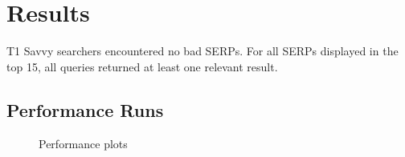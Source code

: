 \section{Results}

T1 Savvy searchers encountered no bad SERPs. For all SERPs displayed in the top 15, all queries returned at least one relevant result.

\subsection{Performance Runs}

\begin{figure}[p!]
    \centering
    \caption[Performance plots (result summaries)]{Performance plots}
    \label{fig:ch9_perf_ch7_plots}
\end{figure}

